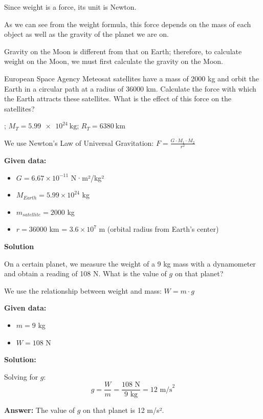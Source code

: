 Since weight is a force, its unit is Newton.

As we can see from the weight formula, this force depends on the mass of each object as well as the gravity of the planet we are on.

\begin{remark}
    Gravity on the Moon is different from that on Earth; therefore, to calculate weight on the Moon, we must first calculate the gravity on the Moon.
\end{remark}

\begin{exercise}
    European Space Agency Meteosat satellites have a mass of 2000 kg and orbit the Earth in a circular path at a radius of 36000 km.
    Calculate the force with which the Earth attracts these satellites.
    What is the effect of this force on the satellites?

    \datos{} \Ggravitacion; \( M_T = \qty{5.99e24}{\kilo\g} \); \( R_T = \qty{6380}{\kilo\metre} \)

    \begin{solu}
        We use Newton's Law of Universal Gravitation: $F = \frac{G \cdot M_1 \cdot M_2}{r^2}$

        \textbf{Given data:}
        \begin{itemize}
            \item $G = 6.67 \times 10^{-11}$ N·m²/kg²
            \item $M_{Earth} = 5.99 \times 10^{24}$ kg
            \item $m_{satellite} = 2000$ kg
            \item $r = 36000$ km = $3.6 \times 10^7$ m (orbital radius from Earth's center)
        \end{itemize}

        \textbf{Solution}
    \end{solu}
\end{exercise}



\begin{exercise}
    On a certain planet, we measure the weight of a 9 kg mass with a dynamometer and obtain a reading of 108 N. What is the value of \( g \) on that planet?
    \begin{solu}
        We use the relationship between weight and mass: $W = m \cdot g$

        \textbf{Given data:}
        \begin{itemize}
            \item $m = 9$ kg
            \item $W = 108$ N
        \end{itemize}

        \textbf{Solution:}

        Solving for $g$:
        $$g = \frac{W}{m} = \frac{108\text{ N}}{9\text{ kg}} = 12\text{ m/s}^2$$

        \textbf{Answer:} The value of $g$ on that planet is 12 m/s².
    \end{solu}
\end{exercise}

